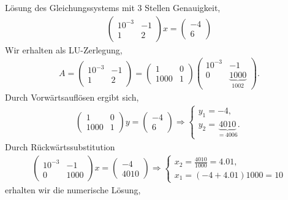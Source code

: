 \begin{bspn}Lösung des Gleichungssystems mit 3 Stellen Genauigkeit,
\begin{align*}
\begin{pmatrix}
10^{-3} & -1 \\ 1 & 2
\end{pmatrix}x =
\begin{pmatrix}
-4 \\ 6
\end{pmatrix}
\end{align*}
Wir erhalten als LU-Zerlegung,
\begin{align*}
A=\begin{pmatrix}
10^{-3} & -1 \\ 1 & 2
\end{pmatrix}=
\begin{pmatrix}
1 & 0\\ 1000 & 1
\end{pmatrix}
\begin{pmatrix}
10^{-3} & -1 \\ 0 & \underbrace{1000}_{1002} 
\end{pmatrix}.
\end{align*}
Durch Vorwärtsauflösen ergibt sich,
\begin{align*}
\begin{pmatrix}
1 & 0 \\ 1000 & 1
\end{pmatrix}y = 
\begin{pmatrix}
-4 \\ 6
\end{pmatrix}
\Rightarrow
\begin{cases}
y_1 = -4,\\
y_2 = \underbrace{4010}_{=4006}.
\end{cases}
\end{align*}
Durch Rückwärtssubstitution
\begin{align*}
\begin{pmatrix}
10^{-3} & -1\\
0 & 1000
\end{pmatrix}x
=\begin{pmatrix}
 -4 \\ 4010
 \end{pmatrix}
\Rightarrow
\begin{cases}
x_2 = \frac{4010}{1000} = 4.01,\\
x_1 = (-4 + 4.01)1000 = 10
\end{cases}
\end{align*}
erhalten wir die numerische Lösung,

\end{bspn}
